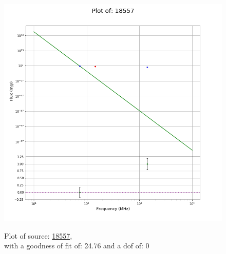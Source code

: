 \documentclass{article}
\begin{document}
\begin{figure}[H]
\begin{minipage}{0.5\textwidth}
        \includegraphics[scale = 0.35]{KmeulenTrap4P23_1min/1min18557.png}
        \captionsetup{labelformat=empty}
        \caption{Plot of source: \href{http://banana.transientskp.org/r4/vlo_KmeulenTrap4P23/runningcatalog/18557}{18557},\\with a goodness of fit of: 24.76 and a dof of: 0}
    \addtocounter{figure}{-1}
    \label{KmeulenTrap4P23:1min:18557:plot}
    \end{minipage}
\end{figure}
\newpage
\end{document}
